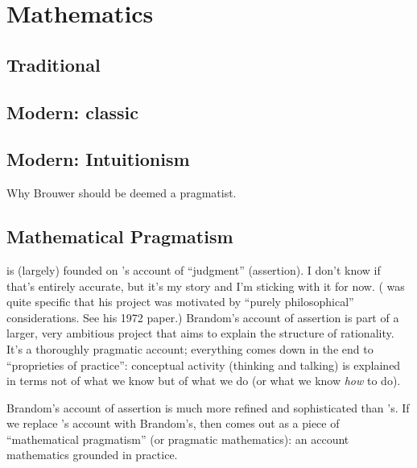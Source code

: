 \chapter{Mathematics}
\label{sect:math}

\section{Traditional}
\label{subs:mathtrad}

\section{Modern: classic}
\label{subs:mathmodclassic}

\section{Modern: Intuitionism}
\label{sect:mathmodintuit}

\begin{ednote}
  Why Brouwer should be deemed a pragmatist.
\end{ednote}


\section{Mathematical Pragmatism}
\label{sect:mathprag}

\begin{ednote}
  \HoTT is (largely) founded on \ML{}'s account of ``judgment''
  (assertion).  I don't know if that's entirely accurate, but it's my
  story and I'm sticking with it for now.  (\ML{} was quite specific
  that his project was motivated by ``purely philosophical''
  considerations.  See his 1972 paper.)  Brandom's account of
  assertion is part of a larger, very ambitious project that aims to
  explain the structure of rationality.  It's a thoroughly pragmatic
  account; everything comes down in the end to ``proprieties of
  practice'': conceptual activity (thinking and talking) is explained
  in terms not of what we know but of what we do (or what we know
  \textit{how} to do).

  Brandom's account of assertion is much more refined and
  sophisticated than \ML{}'s.  If we replace \ML{}'s account with
  Brandom's, then \HoTT comes out as a piece of ``mathematical
  pragmatism'' (or pragmatic mathematics): an account mathematics
  grounded in practice.
\end{ednote}

